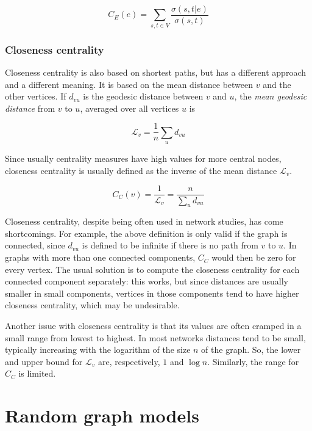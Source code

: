\documentclass[oneside,openany]{memoir}
\begin{document}
\begin{equation}
C_{E}(e) = \sum_{s,t \in V} \frac{\sigma(s,t|e)}{\sigma(s,t)}
\end{equation}

\subsubsection{Closeness centrality}\label{closeness-centrality}

Closeness centrality is also based on shortest paths, but has a
different approach and a different meaning. It is based on the mean
distance between $v$ and the other vertices. If $d_{vu}$ is the geodesic
distance between $v$ and $u$, the \emph{mean geodesic distance} from $v$
to $u$, averaged over all vertices $u$ is

\begin{equation}
\mathcal{L}_v = \frac{1}{n} \sum_u d_{vu}  %
\end{equation}

Since usually centrality measures have high values for more central
nodes, closeness centrality is usually defined as the inverse of the
mean distance $\mathcal{L}_v$.

\begin{equation}
C_C(v) = \frac{1}{\mathcal{L}_v} = \frac{n}{\sum_u d_{vu}}  %
\end{equation}

Closeness centrality, despite being often used in network studies, has
come shortcomings. For example, the above definition is only valid if
the graph is connected, since $d_{vu}$ is defined to be infinite if
there is no path from $v$ to $u$. In graphs with more than one connected
components, $C_C$ would then be zero for every vertex. The usual
solution is to compute the closeness centrality for each connected
component separately: this works, but since distances are usually
smaller in small components, vertices in those components tend to have
higher closeness centrality, which may be undesirable.

Another issue with closeness centrality is that its values are often
cramped in a small range from lowest to highest. In most networks
distances tend to be small, typically increasing with the logarithm of
the size $n$ of the graph. So, the lower and upper bound for
$\mathcal{L}_v$ are, respectively, $1$ and $\log n$. Similarly, the
range for $C_C$ is limited.

\section{Random graph models}\label{random-graph-models}
\end{document}
